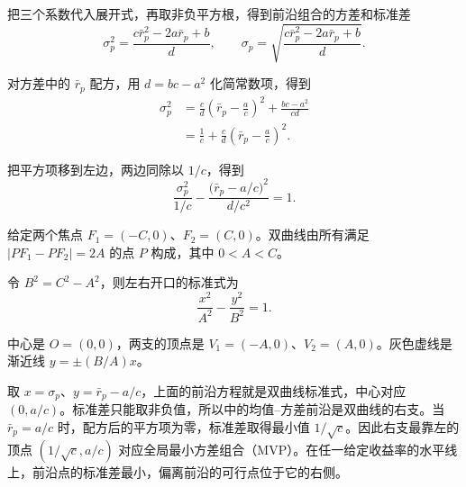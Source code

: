 把三个系数代入展开式，再取非负平方根，得到前沿组合的方差和标准差
\[
 \sigma_p^2=\frac{c\bar r_p^2-2a\bar r_p+b}{d},
 \qquad
 \sigma_p=\sqrt{\frac{c\bar r_p^2-2a\bar r_p+b}{d}}.
\]

对方差中的 $\bar r_p$ 配方，用 $d=bc-a^2$ 化简常数项，得到
\begin{equation*}
 \begin{aligned}
 \sigma_p^2
 &=\frac cd\left(\bar r_p-\frac ac\right)^2+\frac{bc-a^2}{cd}\\
 &=\frac1c+\frac cd\left(\bar r_p-\frac ac\right)^2.
 \end{aligned}
 \tag{12.VII}\label{eq:wj-12-frontier-centered-variance}
\end{equation*}

把平方项移到左边，两边同除以 $1/c$，得到
\[
 \frac{\sigma_p^2}{1/c}
 -\frac{\bigl(\bar r_p-a/c\bigr)^2}{d/c^2}=1.
\]

\begin{tcolorbox}[knowledge,title={双曲线的定义与标准式}]
\begin{minipage}[c]{.51\linewidth}
给定两个焦点 $F_1=(-C,0)$、$F_2=(C,0)$。双曲线由所有满足 $\bigl|PF_1-PF_2\bigr|=2A$ 的点 $P$ 构成，其中 $0<A<C$。

令 $B^2=C^2-A^2$，则左右开口的标准式为
\[
 \frac{x^2}{A^2}-\frac{y^2}{B^2}=1.
\]

中心是 $O=(0,0)$，两支的顶点是 $V_1=(-A,0)$、$V_2=(A,0)$。灰色虚线是渐近线 $y=\pm(B/A)x$。
\end{minipage}\hfill
\begin{minipage}[c]{.46\linewidth}
\centering
{}\par
\end{minipage}
\end{tcolorbox}

取 $x=\sigma_p$、$y=\bar r_p-a/c$，上面的前沿方程就是双曲线标准式，中心对应 $(0,a/c)$。标准差只能取非负值，所以中的均值--方差前沿是双曲线的右支。当 $\bar r_p=a/c$ 时，配方后的平方项为零，标准差取得最小值 $1/\sqrt c$。因此右支最靠左的顶点 $(1/\sqrt c,a/c)$ 对应全局最小方差组合（MVP）。在任一给定收益率的水平线上，前沿点的标准差最小，偏离前沿的可行点位于它的右侧。

\begin{center}
\begin{minipage}{\linewidth}
\centering
{}%
\par
{}
\end{minipage}
\end{center}

